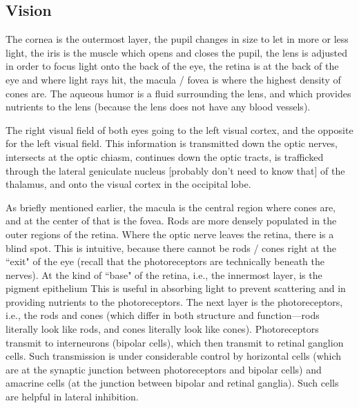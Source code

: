 \subsection{Vision}

The cornea is the outermost layer, the pupil changes in size to let in more or less light, the iris is the muscle which opens and closes the pupil, the lens is adjusted in order to focus light onto the back of the eye, the retina is at the back of the eye and where light rays hit, the macula / fovea is where the highest density of cones are. The aqueous humor is a fluid surrounding the lens, and which provides nutrients to the lens (because the lens does not have any blood vessels).\newline

The right visual field of both eyes going to the left visual cortex, and the opposite for the left visual field. This information is transmitted down the optic nerves, intersects at the optic chiasm, continues down the optic tracts, is trafficked through the lateral geniculate nucleus [probably don't need to know that] of the thalamus, and onto the visual cortex in the occipital lobe.\newline

As briefly mentioned earlier, the macula is the central region where cones are, and at the center of that is the fovea. Rods are more densely populated in the outer regions of the retina. Where the optic nerve leaves the retina, there is a blind spot. This is intuitive, because there cannot be rods / cones right at the ``exit" of the eye (recall that the photoreceptors are technically beneath the nerves). At the kind of ``base" of the retina, i.e., the innermost layer, is the pigment epithelium This is useful in absorbing light to prevent scattering and in providing nutrients to the photoreceptors. The next layer is the photoreceptors, i.e., the rods and cones (which differ in both structure and function---rods literally look like rods, and cones literally look like cones). Photoreceptors transmit to interneurons (bipolar cells), which then transmit to retinal ganglion cells. Such transmission is under considerable control by horizontal cells (which are at the synaptic junction between photoreceptors and bipolar cells) and amacrine cells (at the junction between bipolar and retinal ganglia). Such cells are helpful in lateral inhibition. \newline

